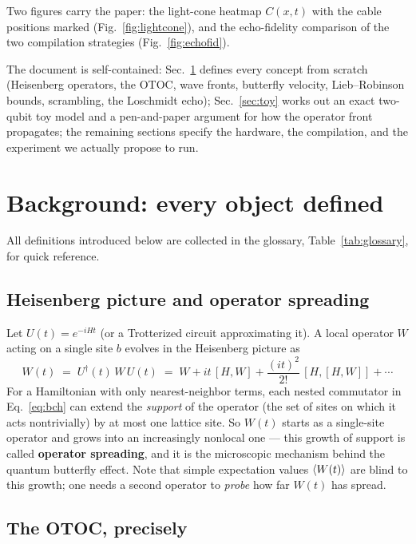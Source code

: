 \documentclass[11pt]{article}
\begin{document}
Two figures carry the paper: the light-cone heatmap $C(x,t)$ with the cable
positions marked (Fig.~\ref{fig:lightcone}), and the echo-fidelity comparison
of the two compilation strategies (Fig.~\ref{fig:echofid}).

The document is self-contained: Sec.~\ref{sec:background} defines every
concept from scratch (Heisenberg operators, the OTOC, wave fronts, butterfly
velocity, Lieb--Robinson bounds, scrambling, the Loschmidt echo);
Sec.~\ref{sec:toy} works out an exact two-qubit toy model and a
pen-and-paper argument for how the operator front propagates; the remaining
sections specify the hardware, the compilation, and the experiment we
actually propose to run.

\section{Background: every object defined}
\label{sec:background}

All definitions introduced below are collected in the glossary,
Table~\ref{tab:glossary}, for quick reference.

\subsection{Heisenberg picture and operator spreading}

Let $U(t)=e^{-iHt}$ (or a Trotterized circuit approximating it). A local
operator $W$ acting on a single site $b$ evolves in the Heisenberg picture as
\begin{equation}
  W(t) \;=\; U^\dagger(t)\, W\, U(t)
  \;=\; W + it\,[H,W] + \frac{(it)^2}{2!}\,[H,[H,W]] + \cdots
  \label{eq:bch}
\end{equation}
For a Hamiltonian with only nearest-neighbor terms, each nested commutator in
Eq.~\eqref{eq:bch} can extend the \emph{support} of the operator (the set of
sites on which it acts nontrivially) by at most one lattice site. So $W(t)$
starts as a single-site operator and grows into an increasingly nonlocal one
--- this growth of support is called \textbf{operator spreading}, and it is
the microscopic mechanism behind the quantum butterfly effect. Note that
simple expectation values $\expval{W(t)}$ are blind to this growth; one needs
a second operator to \emph{probe} how far $W(t)$ has spread.

\subsection{The OTOC, precisely}
\label{sec:otocdef}
\end{document}
